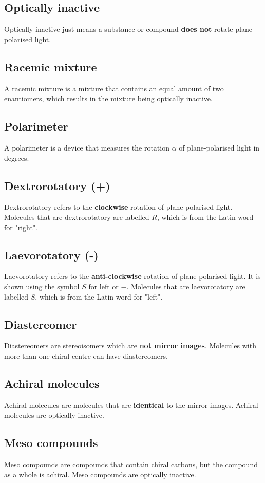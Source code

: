 \documentclass[11pt]{article}
\begin{document}
\subsection{Optically inactive}
\label{sec:org6ae5509}
Optically inactive just means a substance or compound \textbf{does not} rotate plane-polarised light.
\subsection{Racemic mixture}
\label{sec:orgae32fb0}
A racemic mixture is a mixture that contains an equal amount of two enantiomers, which results in the mixture being optically inactive.
\subsection{Polarimeter}
\label{sec:org33df14d}
A polarimeter is a device that measures the rotation \(\alpha\) of plane-polarised light in degrees.
\subsection{Dextrorotatory (+)}
\label{sec:org97df1df}
Dextrorotatory refers to the \textbf{clockwise} rotation of plane-polarised light. Molecules that are dextrorotatory are labelled \(R\), which is from the Latin word for "right".
\subsection{Laevorotatory (-)}
\label{sec:orga40cba1}
Laevorotatory refers to the \textbf{anti-clockwise} rotation of plane-polarised light. It is shown using the symbol \(S\) for left or \(-\). Molecules that are laevorotatory are labelled \(S\), which is from the Latin word for "left".
\subsection{Diastereomer}
\label{sec:org5640c3e}
Diastereomers are stereoisomers which are \textbf{not mirror images}. Molecules with more than one chiral centre can have diastereomers.
\subsection{Achiral molecules}
\label{sec:org76bdf76}
Achiral molecules are molecules that are \textbf{identical} to the mirror images. Achiral molecules are optically inactive.
\subsection{Meso compounds}
\label{sec:org8080b83}
Meso compounds are compounds that contain chiral carbons, but the compound as a whole is achiral. Meso compounds are optically inactive.
\end{document}

